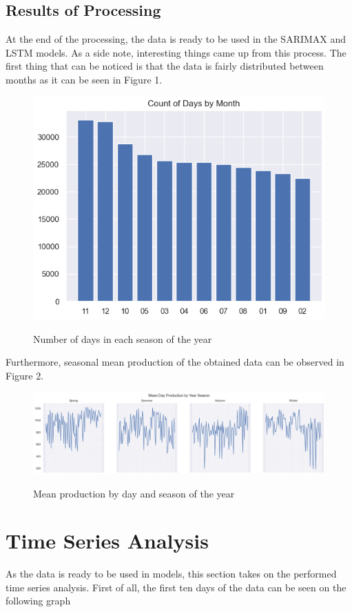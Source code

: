 \documentclass[a4paper,12pt]{article}
\begin{document}
\subsection{Results of Processing}
At the end of the processing, the data is ready to be used in the SARIMAX and LSTM models. As a side note, interesting things came up from this process. The first thing that can be noticed is that the data is fairly distributed between months as it can be seen in Figure 1.

\begin{figure}[H] %
    \centering %
    \caption{Number of days in each season of the year} %
    \includegraphics[height=0.40\textwidth]{conteo.png} %
    \label{fig:etiqueta_imagen} %
\end{figure}

Furthermore, seasonal mean production of the obtained data can be observed in Figure 2.

\begin{figure}[H] %
    \centering %
    \caption{Mean production by day and season of the year} %
    \includegraphics[width=1\textwidth]{temporada.png} %
    \label{fig:etiqueta_imagen} %
\end{figure}

\section{Time Series Analysis}
As the data is ready to be used in models, this section takes on the performed time series analysis. First of all, the first ten days of the data can be seen on the following graph
\end{document}
